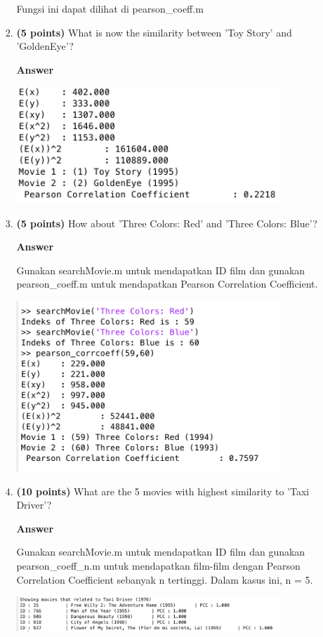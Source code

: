 \documentclass[12pt]{article}%
\begin{document}
\begin{enumerate}
\begin{enumerate}
\begin{enumerate}
			\par Fungsi ini dapat dilihat di pearson\_coeff.m

			\item \textbf{(5 points)} What is now the similarity between 'Toy Story' and 'GoldenEye'?

			\par \textbf{Answer}
			\par \includegraphics[width=10cm]{ss_13bii}

			\item \textbf{(5 points)} How about 'Three Colors: Red' and 'Three Colors: Blue'?
			\par \textbf{Answer}
			\par Gunakan searchMovie.m untuk mendapatkan ID film dan gunakan pearson\_coeff.m untuk mendapatkan Pearson Correlation Coefficient.
			\par \includegraphics[width=10cm]{ss_13biii}

			\item \textbf{(10 points)} What are the 5 movies with highest similarity to 'Taxi Driver'?
			\par \textbf{Answer}
			\par Gunakan searchMovie.m untuk mendapatkan ID film dan gunakan pearson\_coeff\_n.m untuk mendapatkan film-film dengan Pearson Correlation Coefficient sebanyak n tertinggi. Dalam kasus ini, n = 5.
			\par \includegraphics[width=10cm]{ss_13biv}


\end{enumerate}
\end{enumerate}
\end{enumerate}
\end{document}
